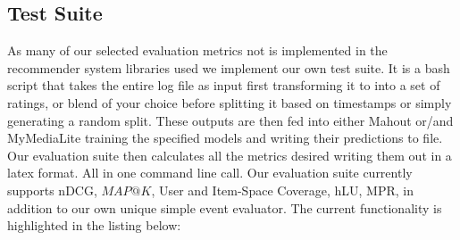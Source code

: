 \subsection{Test Suite}

As many of our selected evaluation metrics not is implemented in the recommender system libraries used we implement our own test suite. It is a bash
script that takes the entire log file as input first transforming it to into a set of ratings, or blend of your choice before splitting it based on timestamps
or simply generating a random split. These outputs are then fed into either Mahout or/and MyMediaLite training the specified models and writing their predictions to file. Our evaluation suite then calculates all the metrics desired writing them out in a latex format. All in one command line call. Our evaluation suite currently supports nDCG, $MAP@K$, User and Item-Space Coverage, hLU, MPR, in addition to our own unique simple event evaluator. The current functionality is
highlighted in the listing below:

